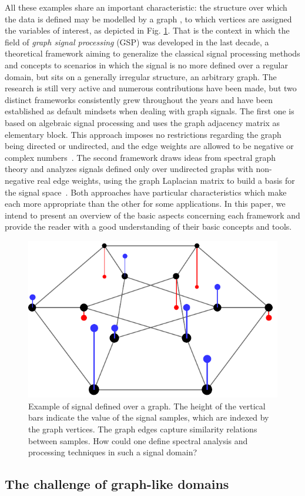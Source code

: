 All these examples share an important characteristic: the structure over which the data is defined may be modelled by a graph \cite{mei2016signal}, to which vertices are assigned the variables of interest, as depicted in Fig. \ref{fig:duher}. That is the context in which the field of \emph{graph signal processing} (GSP) was developed in the last decade, a theoretical framework aiming to generalize the classical signal processing methods and concepts to scenarios in which the signal is no more defined over a regular domain, but sits on a generally irregular structure, an arbitrary graph. The research is still very active and numerous contributions have been made, but two distinct frameworks consistently grew throughout the years and have been established as default mindsets when dealing with graph signals. The first one is based on algebraic signal processing and uses the graph adjacency matrix as elementary block. This approach imposes no restrictions regarding the graph being directed or undirected, and the edge weights are allowed to be negative or complex numbers~\cite{sandryhaila2014big}. The second framework draws ideas from spectral graph theory and analyzes signals defined only over undirected graphs with non-negative real edge weights, using the graph Laplacian matrix to build a basis for the signal space~\cite{shuman2013emerging}. Both approaches have particular characteristics which make each more appropriate than the other for some applications. In this paper, we intend to present an overview of the basic aspects concerning each framework and provide the reader with a good understanding of their basic concepts and tools.

\begin{figure}
	\centering
	\includegraphics[width=0.25\linewidth]{Figures/signal_duher_graph_2.pdf}
	\caption{Example of signal defined over a graph. The height of the vertical bars indicate the value of the signal samples, which are indexed by the graph vertices. The graph edges capture similarity relations between samples. How could one define spectral analysis and processing techniques in such a signal domain?}
	\label{fig:duher}
\end{figure}

\subsection{The challenge of graph-like domains}

